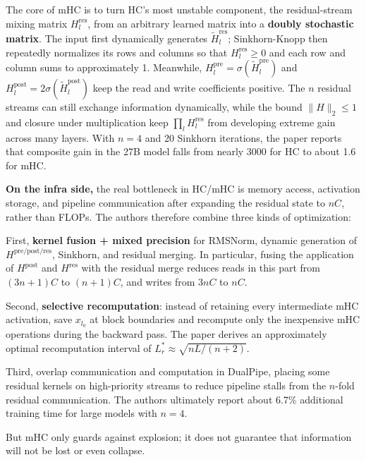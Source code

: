\documentclass[
  english,
  11pt,
  a4paper,
]{article}
\begin{document}
The core of mHC is to turn HC's most unstable component, the
residual-stream mixing matrix \(H_l^{\mathrm{res}}\), from an arbitrary
learned matrix into a \textbf{doubly stochastic matrix}. The input first
dynamically generates \(\tilde{H}_l^{\mathrm{res}}\); Sinkhorn-Knopp
then repeatedly normalizes its rows and columns so that
\(H_l^{\mathrm{res}}\ge 0\) and each row and column sums to
approximately 1. Meanwhile,
\(H_l^{\mathrm{pre}}=\sigma(\tilde{H}_l^{\mathrm{pre}})\) and
\(H_l^{\mathrm{post}}=2\sigma(\tilde{H}_l^{\mathrm{post}})\) keep the
read and write coefficients positive. The \(n\) residual streams can
still exchange information dynamically, while the bound \(\|H\|_2\le 1\)
and closure under multiplication keep \(\prod_l H_l^{\mathrm{res}}\)
from developing extreme gain across many layers. With \(n=4\) and 20
Sinkhorn iterations, the paper reports that composite gain in the 27B
model falls from nearly 3000 for HC to about 1.6 for mHC.

\textbf{On the infra side,} the real bottleneck in HC/mHC is memory
access, activation storage, and pipeline communication after expanding
the residual state to \(nC\), rather than FLOPs. The authors therefore
combine three kinds of optimization:

First, \textbf{kernel fusion + mixed precision} for RMSNorm, dynamic
generation of \(H^{\mathrm{pre/post/res}}\), Sinkhorn, and residual
merging. In particular, fusing the application of \(H^{\mathrm{post}}\)
and \(H^{\mathrm{res}}\) with the residual merge reduces reads in this
part from \((3n+1)C\) to \((n+1)C\), and writes from \(3nC\) to \(nC\).

Second, \textbf{selective recomputation}: instead of retaining every
intermediate mHC activation, save \(x_{l_0}\) at block boundaries and
recompute only the inexpensive mHC operations during the backward pass.
The paper derives an approximately optimal recomputation interval of
\(L_r^*\approx\sqrt{nL/(n+2)}\).

Third, overlap communication and computation in DualPipe, placing some
residual kernels on high-priority streams to reduce pipeline stalls from
the \(n\)-fold residual communication. The authors ultimately report
about 6.7\% additional training time for large models with \(n=4\).

But mHC only guards against explosion; it does not guarantee that
information will not be lost or even collapse.

\clearpage

\begingroup
\linespread{1.0}\selectfont
\end{document}
